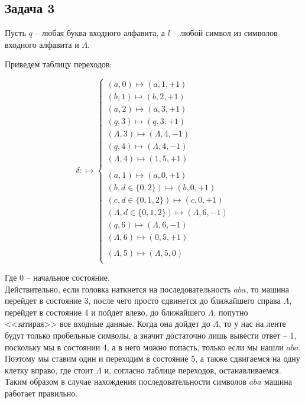 	\subsection{Задача 3}
	
	Пусть $q$ -- любая буква входного алфавита, а $l$ -- любой символ из символов входного алфавита и $\Lambda$.
	
	Приведем таблицу переходов:
	
	\[\delta: \mapsto
	\begin{cases}
	(a, 0) \mapsto (a, 1, +1) \\
	(b, 1) \mapsto (b, 2, +1) \\
	(a, 2) \mapsto (a, 3, +1) \\
	(q, 3) \mapsto (q, 3, +1) \\
	(\Lambda, 3) \mapsto (\Lambda, 4, -1) \\
	(q, 4) \mapsto (\Lambda, 4, -1) \\
	(\Lambda, 4) \mapsto (1, 5, +1) \\\\

	(a,1) \mapsto (a, 0, +1) \\
	(b,d \in \{0, 2\}) \mapsto (b, 0, +1) \\
	(c,d \in \{0, 1, 2\}) \mapsto (c, 0, +1) \\

	(\Lambda, d \in \{0, 1, 2\}) \mapsto (\Lambda, 6, -1) \\
	(q, 6) \mapsto (\Lambda, 6, -1) \\
	(\Lambda, 6) \mapsto (0, 5, +1) \\\\
	
	(\Lambda, 5) \mapsto (\Lambda, 5, 0) \\
	\end{cases}
	\]
	
	Где 0 -- начальное состояние. \\
	Действительно, если головка наткнется на последовательность $aba$, то машина перейдет в состояние 3, после чего просто сдвинется до ближайшего справа $\Lambda$, перейдет в состояние 4 и пойдет влево, до ближайшего $\Lambda$, попутно <<затирая>> все входные данные. Когда она дойдет до $\Lambda$, то у нас на ленте будут только пробельные символы, а значит достаточно лишь вывести ответ -- 1, поскольку мы в  состоянии 4, а в него можно попасть, только если мы нашли $aba$. Поэтому мы ставим один и переходим в состояние 5, а также сдвигаемся на одну клетку вправо, где стоит $\Lambda$ и, согласно таблице переходов, останавливаемся. Таким образом в случае нахождения последовательности символов $aba$ машина работает правильно. \\\\
	
